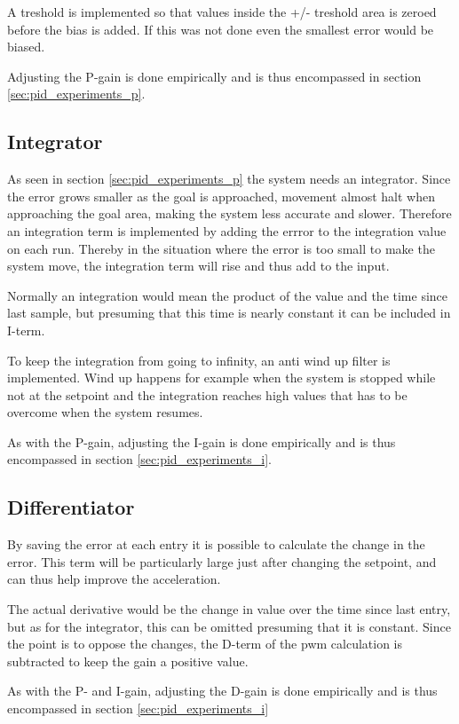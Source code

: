A treshold is implemented so that values inside the +/- treshold area is zeroed before the bias is added. If this was not done even the smallest error would be biased.

Adjusting the P-gain is done empirically and is thus encompassed in section \ref{sec:pid_experiments_p}.

\subsection{Integrator}\label{sec:integrator}
As seen in section \ref{sec:pid_experiments_p} the system needs an integrator. Since the error grows smaller as the goal is approached, movement almost halt when approaching the goal area, making the system less accurate and slower. Therefore an integration term is implemented by adding the errror to the integration value on each run. Thereby in the situation where the error is too small to make the system move, the integration term will rise and thus add to the input. 

Normally an integration would mean the product of the value and the time since last sample, but presuming that this time is nearly constant it can be included in I-term. 

To keep the integration from going to infinity, an anti wind up filter is implemented. Wind up happens for example when the system is stopped while not at the setpoint and the integration reaches high values that has to be overcome when the system resumes.

As with the P-gain, adjusting the I-gain is done empirically and is thus encompassed in section \ref{sec:pid_experiments_i}.

\subsection{Differentiator}
By saving the error at each entry it is possible to calculate the change in the error. This term will be particularly large just after changing the setpoint, and can thus help improve the acceleration. 

The actual derivative would be the change in value over the time since last entry, but as for the integrator, this can be omitted presuming that it is constant. Since the point is to oppose the changes, the D-term of the pwm calculation is subtracted to keep the gain a positive value.

As with the P- and I-gain, adjusting the D-gain is done empirically and is thus encompassed in section \ref{sec:pid_experiments_i}


